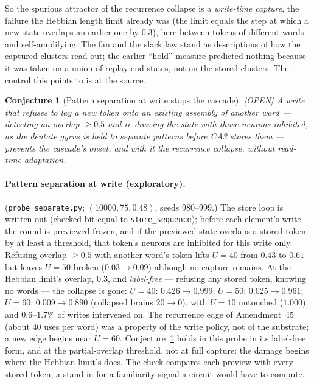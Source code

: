 \documentclass[11pt]{article}
\theoremstyle{definition}
\theoremstyle{plain}
\newtheorem{conjecture}[lemma]{Conjecture}
\newcommand{\OPEN}{\textnormal{\footnotesize\textsf{[OPEN]}}}
\begin{document}
So the spurious attractor of the recurrence collapse is a \emph{write-time
capture}, the failure the Hebbian length limit already was (the limit equals
the step at which a new state overlaps an earlier one by $0.3$), here between
tokens of different words and self-amplifying. The fan and the slack law stand
as descriptions of how the captured clusters read out; the earlier ``hold''
measure predicted nothing because it was taken on a union of replay end states,
not on the stored clusters. The control this points to is at the source.

\begin{conjecture}[Pattern separation at write stops the cascade]\label{conj:separation} \OPEN
A write that refuses to lay a new token onto an existing assembly of another
word --- detecting an overlap $\ge 0.5$ and re-drawing the state with those
neurons inhibited, as the dentate gyrus is held to separate patterns before
CA3 stores them --- prevents the cascade's onset, and with it the recurrence
collapse, without read-time adaptation.
\end{conjecture}

\paragraph{Pattern separation at write (exploratory).} (\texttt{probe\_separate.py};
$(10000,75,0.48)$, seeds $980$--$999$.) The store loop is written out (checked
bit-equal to \texttt{store\_sequence}); before each element's write the round is
previewed frozen, and if the previewed state overlaps a stored token by at
least a threshold, that token's neurons are inhibited for this write only.
Refusing overlap $\ge 0.5$ with another word's token lifts $U = 40$ from $0.43$ to
$0.61$ but leaves $U = 50$ broken ($0.03 \to 0.09$) although no capture remains.
At the Hebbian limit's overlap, $0.3$, and \emph{label-free} --- refusing any
stored token, knowing no words --- the collapse is gone: $U = 40$: $0.426 \to
0.999$; $U = 50$: $0.025 \to 0.961$; $U = 60$: $0.009 \to 0.890$ (collapsed brains
$20 \to 0$), with $U = 10$ untouched ($1.000$) and $0.6$--$1.7\%$ of writes
intervened on. The recurrence edge of Amendment~45 (about $40$ uses per word)
was a property of the write policy, not of the substrate; a new edge begins
near $U = 60$. Conjecture~\ref{conj:separation} holds in this probe in its
label-free form, and at the partial-overlap threshold, not at full capture: the
damage begins where the Hebbian limit's does. The check compares each preview
with every stored token, a stand-in for a familiarity signal a circuit would
have to compute.
\end{document}
